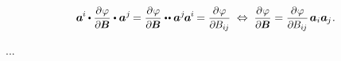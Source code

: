 \nopagebreak\vspace{-0.1em}\begin{equation*}
\bm{a}^{\hspace{-0.1ex}i} \hspace{-0.15ex} \dotp \scalebox{0.92}{$\displaystyle\frac{\partial \hspace{.1ex} \varphi}{\partial \hspace{-0.1ex} \bm{B}}$} \dotp \bm{a}^j \hspace{-0.2ex}
=
\scalebox{0.92}{$\displaystyle\frac{\partial \hspace{.1ex} \varphi}{\partial \hspace{-0.1ex} \bm{B}}$} \dotdotp \bm{a}^j \hspace{-0.2ex} \bm{a}^{\hspace{-0.1ex}i} \hspace{-0.2ex}
=
\scalebox{0.92}{$\displaystyle\frac{\partial \hspace{.1ex} \varphi}{\partial \hspace{-0.15ex} \somebivalenttensorcomponents{i\hspace{-0.1ex}j}}$}
\;\Leftrightarrow\;
\scalebox{0.92}{$\displaystyle\frac{\partial \hspace{.1ex} \varphi}{\partial \hspace{-0.1ex} \bm{B}}$}
=
\scalebox{0.92}{$\displaystyle\frac{\partial \hspace{.1ex} \varphi}{\partial \hspace{-0.15ex} \somebivalenttensorcomponents{i\hspace{-0.1ex}j}}$} \hspace{.25ex} \bm{a}_i \bm{a}_{\hspace{-0.1ex}j}
\hspace{.1ex} .
\end{equation*}

...

